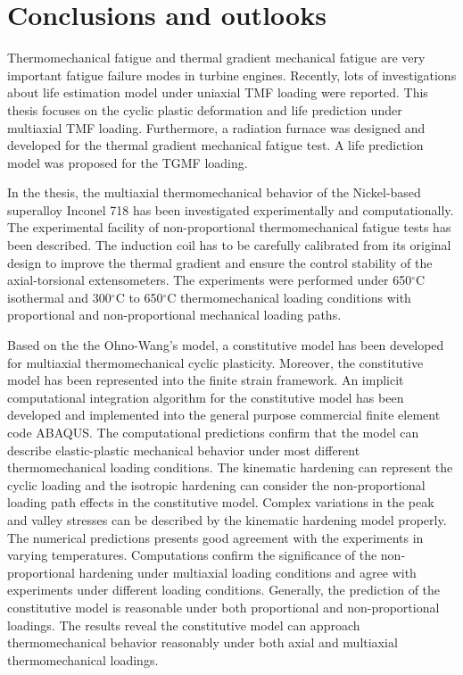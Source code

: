 \chapter{Conclusions and outlooks}
\noindent
Thermomechanical fatigue and thermal gradient mechanical fatigue are very important fatigue failure modes in turbine engines.
Recently, lots of investigations about life estimation model under uniaxial TMF loading were reported. This thesis focuses on the cyclic plastic deformation and life prediction under multiaxial TMF loading. Furthermore, a radiation furnace was designed and developed for the thermal gradient mechanical fatigue test. A life prediction model was proposed for the TGMF loading.

In the thesis, the multiaxial thermomechanical behavior of the Nickel-based superalloy Inconel 718 has been investigated experimentally and computationally.
The experimental facility of non-proportional thermomechanical fatigue tests has been described. The induction coil has to be carefully calibrated from its original design to improve the thermal gradient and ensure the control stability of the axial-torsional extensometers. The experiments were performed under 650$^\circ$C isothermal and 300$^\circ$C to 650$^\circ$C thermomechanical loading conditions with proportional and non-proportional mechanical loading paths. 

Based on the the Ohno-Wang's model, a constitutive model has been developed for multiaxial thermomechanical cyclic plasticity.
Moreover, the constitutive model has been represented into the finite strain framework.
An implicit computational integration algorithm for the constitutive model has been developed and implemented into the general purpose commercial finite element code ABAQUS. The computational predictions confirm that the model can describe elastic-plastic mechanical behavior under most different thermomechanical loading conditions.
The kinematic hardening can represent the cyclic loading and the isotropic hardening can consider the non-proportional loading path effects in the constitutive model.
Complex variations in the peak and valley stresses can be described by the kinematic hardening model properly. The numerical predictions presents good agreement with the experiments in varying temperatures.
Computations confirm the significance of the non-proportional hardening under multiaxial loading conditions and agree with experiments under different loading conditions. Generally, the prediction of the constitutive model is reasonable under both proportional and non-proportional loadings.
The results reveal the constitutive model can approach thermomechanical behavior reasonably under both axial and multiaxial thermomechanical loadings.

